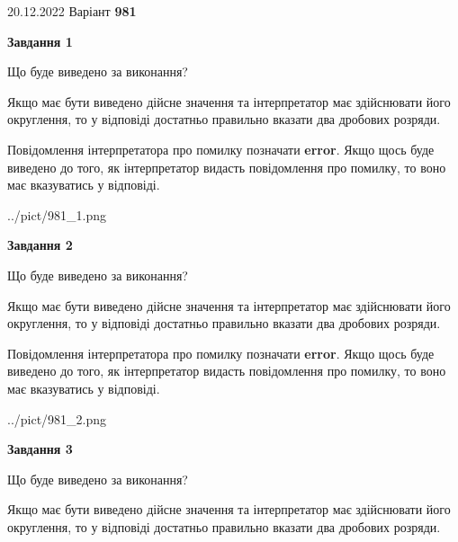 \documentclass[12pt, ukrainian]{article}
\begin{document}
{20.12.2022 Варіант \No \textbf { 981 }\par}
{
\begin {Large}

{\begin {center}\textbf{Завдання 1}\end {center}}\par
Що буде виведено за виконання? \par

Якщо має бути виведено дійсне значення та інтерпретатор має здійснювати його округлення, 
то у відповіді достатньо правильно вказати два дробових розряди.

Повідомлення інтерпретатора про помилку позначати \textbf{error}.
Якщо щось буде виведено до того, як інтерпретатор видасть повідомлення про помилку, 
то воно має вказуватись у відповіді. \par

\begin{center}
	{../pict/981_1.png}
\end{center}
\newpage

{\begin {center}\textbf{Завдання 2}\end {center}}\par
Що буде виведено за виконання? \par

Якщо має бути виведено дійсне значення та інтерпретатор має здійснювати його округлення, 
то у відповіді достатньо правильно вказати два дробових розряди.

Повідомлення інтерпретатора про помилку позначати \textbf{error}.
Якщо щось буде виведено до того, як інтерпретатор видасть повідомлення про помилку, 
то воно має вказуватись у відповіді. \par

\begin{center}
	{../pict/981_2.png}
\end{center}
\newpage

{\begin {center}\textbf{Завдання 3}\end {center}}\par
Що буде виведено за виконання? \par

Якщо має бути виведено дійсне значення та інтерпретатор має здійснювати його округлення, 
то у відповіді достатньо правильно вказати два дробових розряди.


\end{Large}}
\end{document}
